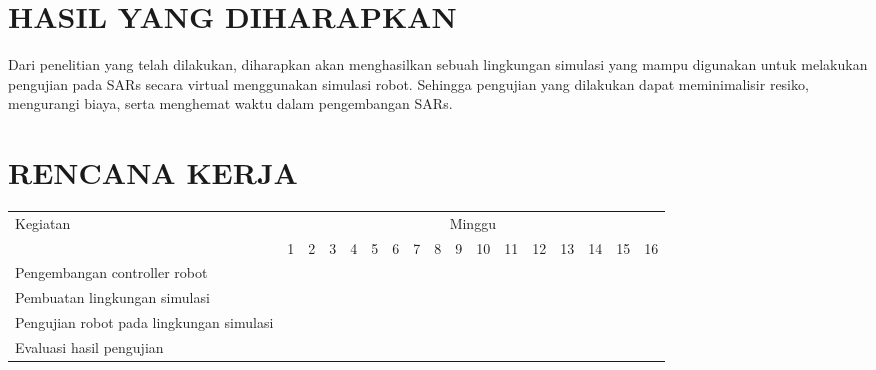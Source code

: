 \section{HASIL YANG DIHARAPKAN}

Dari penelitian yang telah dilakukan, diharapkan akan menghasilkan sebuah lingkungan simulasi yang mampu digunakan untuk melakukan pengujian pada SARs secara virtual menggunakan simulasi robot.
Sehingga pengujian yang dilakukan dapat meminimalisir resiko, mengurangi biaya, serta menghemat waktu dalam pengembangan SARs.

\section{RENCANA KERJA}

\newcommand{\w}{}
\newcommand{\G}{\cellcolor{gray}}
\begin{table}[h!]
  \begin{tabular}{|p{3.5cm}|c|c|c|c|c|c|c|c|c|c|c|c|c|c|c|c|}

    \hline
    \multirow{2}{*}{Kegiatan} & \multicolumn{16}{|c|}{Minggu} \\
    \cline{2-17} &
    1 & 2 & 3 & 4 & 5 & 6 & 7 & 8 & 9 & 10 & 11 & 12 & 13 & 14 & 15 & 16 \\
    \hline

    Pengembangan controller robot &
    \G & \G & \G & \G & \G & \G & \w & \w & \w & \w & \w & \w & \w & \w & \w & \w \\
    \hline

    Pembuatan lingkungan simulasi &
    \w & \w & \w & \w & \w & \w & \G & \G & \G & \G & \w & \w & \w & \w & \w & \w \\
    \hline

    Pengujian robot pada lingkungan simulasi &
    \w & \w & \w & \w & \w & \w & \w & \w & \w & \w & \G & \G & \G & \G & \w & \w \\
    \hline

    Evaluasi hasil pengujian &
    \w & \w & \w & \w & \w & \w & \w & \w & \w & \w & \w & \w & \w & \w & \G & \G \\
    \hline

  \end{tabular}
\end{table}
